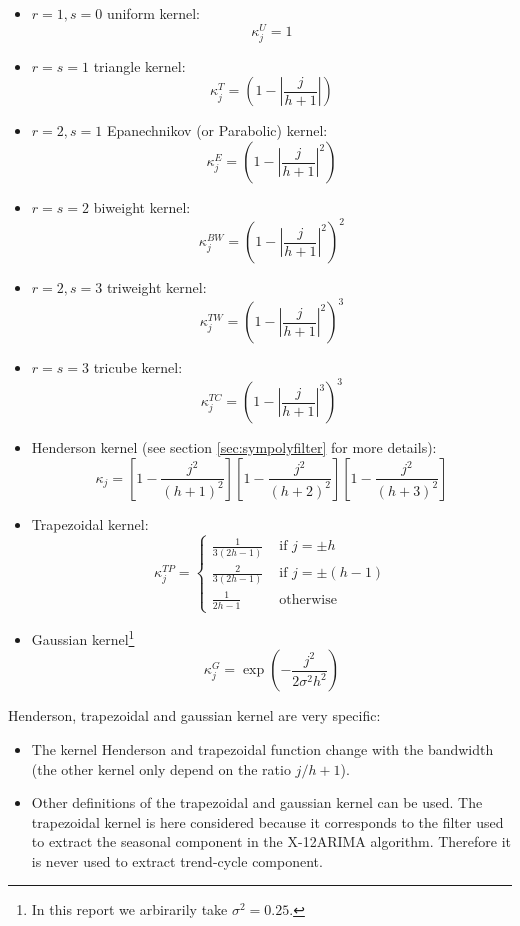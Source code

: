 \documentclass[
  12pt,
  ,
  a4paper]{article}
\newcommand\1{\mathds{1}}
\begin{document}
\begin{multicols}{2}
\begin{itemize}
\item $r=1,s=0$ uniform kernel: 
$$\kappa_j^U=1$$
\item $r=s=1$ triangle kernel:
$$\kappa_j^T=\left(
  1-
  \left\lvert
  \frac j {h+1}
  \right\lvert
\right)$$

\item $r=2,s=1$  Epanechnikov (or Parabolic) kernel:
$$\kappa_j^E=\left(
  1-
  \left\lvert
  \frac j {h+1}
  \right\lvert^2
\right)$$

\item $r=s=2$ biweight kernel:
$$\kappa_j^{BW}=\left(
  1-
  \left\lvert
  \frac j {h+1}
  \right\lvert^2
\right)^2$$

\item $r = 2, s = 3$ triweight kernel:
$$\kappa_j^{TW}=\left(
  1-
  \left\lvert
  \frac j {h+1}
  \right\lvert^2
\right)^3$$

\item $r = s = 3$ tricube kernel:
$$\kappa_j^{TC}=\left(
  1-
  \left\lvert
  \frac j {h+1}
  \right\lvert^3
\right)^3$$

\item Henderson kernel (see section \ref{sec:sympolyfilter} for more details):
$$
\kappa_{j}=\left[1-\frac{j^2}{(h+1)^2}\right]
\left[1-\frac{j^2}{(h+2)^2}\right]
\left[1-\frac{j^2}{(h+3)^2}\right]
$$
\item Trapezoidal kernel:
$$
\kappa_j^{TP}=
\begin{cases}
  \frac{1}{3(2h-1)} & \text{ if }j=\pm h 
  \\
  \frac{2}{3(2h-1)} & \text{ if }j=\pm (h-1)\\
  \frac{1}{2h-1}& \text{ otherwise}
\end{cases}
$$
\item Gaussian kernel\footnote{
In this report we arbirarily take $\sigma^2=0.25$.
}
$$
\kappa_j^G=\exp\left(
-\frac{
  j^2
}{
  2\sigma^2h^2
}\right)
$$
\end{itemize}
\end{multicols}

Henderson, trapezoidal and gaussian kernel are very specific:

\begin{itemize}
\item
  The kernel Henderson and trapezoidal function change with the bandwidth (the other kernel only depend on the ratio \(j/h+1\)).
\item
  Other definitions of the trapezoidal and gaussian kernel can be used.
  The trapezoidal kernel is here considered because it corresponds to the filter used to extract the seasonal component in the X-12ARIMA algorithm.
  Therefore it is never used to extract trend-cycle component.
\end{itemize}
\end{document}
